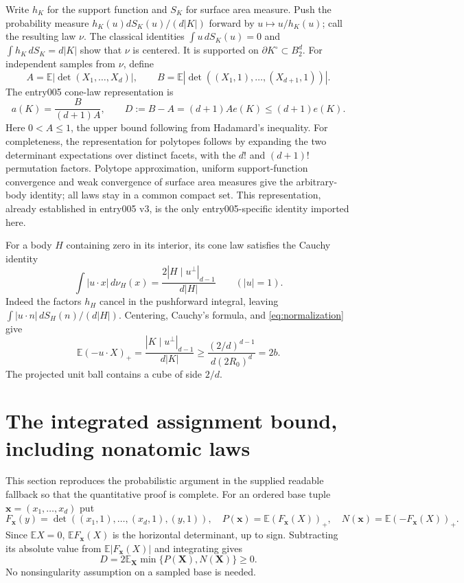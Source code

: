 \documentclass[11pt]{article}
\newcommand{\EE}{\mathbb E}
\newcommand{\pos}[1]{(#1)_+}
\newcommand{\BB}{B_2^d}
\begin{document}
Write $h_K$ for the support function and $S_K$ for surface area measure.
Push the probability measure $h_K(u)dS_K(u)/(d|K|)$ forward by
$u\mapsto u/h_K(u)$; call the resulting law $\nu$.
The classical identities $\int u\,dS_K(u)=0$ and
$\int h_K\,dS_K=d|K|$ show that $\nu$ is centered.
It is supported on $\partial K^\circ\subset\BB$.
For independent samples from $\nu$, define
\[
 A=\EE|\det(X_1,\ldots,X_d)|,\qquad
 B=\EE|\det((X_1,1),\ldots,(X_{d+1},1))|.
\]
The entry005 cone-law representation is
\begin{equation}\label{eq:cone}
 a(K)=\frac{B}{(d+1)A},\qquad
 D:=B-A=(d+1)Ae(K)\le(d+1)e(K).
\end{equation}
Here $0<A\le1$, the upper bound following from Hadamard's inequality.
For completeness, the representation for polytopes follows by expanding
the two determinant expectations over distinct facets, with the $d!$
and $(d+1)!$ permutation factors. Polytope approximation, uniform
support-function convergence and weak convergence of surface area measures
give the arbitrary-body identity; all laws stay in a common compact set.
This representation, already established in entry005 v3, is the only
entry005-specific identity imported here.

For a body $H$ containing zero in its interior, its cone law satisfies
the Cauchy identity
\begin{equation}\label{eq:brightness}
 \int |u\cdot x|\,d\nu_H(x)
   =\frac{2|H\mid u^\perp|_{d-1}}{d|H|}
       \qquad (|u|=1).
\end{equation}
Indeed the factors $h_H$ cancel in the pushforward integral, leaving
$\int|u\cdot n|\,dS_H(n)/(d|H|)$.
Centering, Cauchy's formula, and \eqref{eq:normalization} give
\begin{equation}\label{eq:dispersion}
 \EE\pos{-u\cdot X}
 =\frac{|K\mid u^\perp|_{d-1}}{d|K|}
 \ge\frac{(2/d)^{d-1}}{d(2R_0)^d}=2b.
\end{equation}
The projected unit ball contains a cube of side $2/d$.

\section{The integrated assignment bound, including nonatomic laws}

This section reproduces the probabilistic argument in the supplied readable
fallback so that the quantitative proof is complete.
For an ordered base tuple $\mathbf x=(x_1,\ldots,x_d)$ put
\[
 F_{\mathbf x}(y)
   =\det((x_1,1),\ldots,(x_d,1),(y,1)),
\quad
 P(\mathbf x)=\EE\pos{F_{\mathbf x}(X)},
\quad
 N(\mathbf x)=\EE\pos{-F_{\mathbf x}(X)}.
\]
Since $\EE X=0$, $\EE F_{\mathbf x}(X)$ is the horizontal determinant,
up to sign. Subtracting its absolute value from $\EE|F_{\mathbf x}(X)|$
and integrating gives
\begin{equation}\label{eq:cancellation}
 D=2\EE_{\mathbf X}\min\{P(\mathbf X),N(\mathbf X)\}\ge0.
\end{equation}
No nonsingularity assumption on a sampled base is needed.
\end{document}
